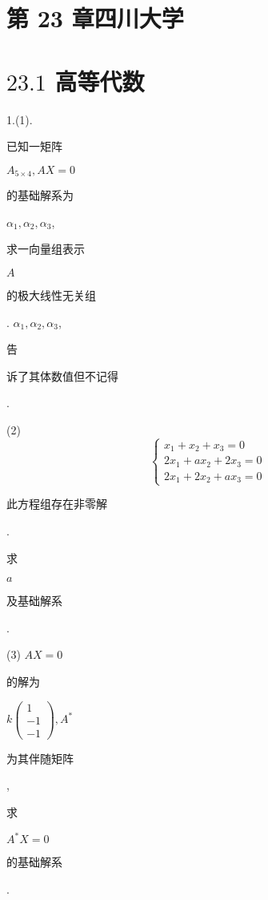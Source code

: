 \documentclass[10pt]{article}
\begin{document}
\section{第 23 章四川大学}
\section{$23.1$ 高等代数}
1.(1). \begin{CJK}{UTF8}{mj}已知一矩阵\end{CJK} $A_{5 \times 4}, A X=0$ \begin{CJK}{UTF8}{mj}的基础解系为\end{CJK} $\alpha_{1}, \alpha_{2}, \alpha_{3}$, \begin{CJK}{UTF8}{mj}求一向量组表示\end{CJK} $A$ \begin{CJK}{UTF8}{mj}的极大线性无关组\end{CJK}. $\alpha_{1}, \alpha_{2}, \alpha_{3}$, \begin{CJK}{UTF8}{mj}告\end{CJK} \begin{CJK}{UTF8}{mj}诉了其体数值但不记得\end{CJK}.

(2)
$$
\left\{\begin{array}{c}
x_{1}+x_{2}+x_{3}=0 \\
2 x_{1}+a x_{2}+2 x_{3}=0 \\
2 x_{1}+2 x_{2}+a x_{3}=0
\end{array}\right.
$$
\begin{CJK}{UTF8}{mj}此方程组存在非零解\end{CJK}. \begin{CJK}{UTF8}{mj}求\end{CJK} $a$ \begin{CJK}{UTF8}{mj}及基础解系\end{CJK}.

(3) $A X=0$ \begin{CJK}{UTF8}{mj}的解为\end{CJK} $k\left(\begin{array}{c}1 \\ -1 \\ -1\end{array}\right), A^{*}$ \begin{CJK}{UTF8}{mj}为其伴随矩阵\end{CJK}, \begin{CJK}{UTF8}{mj}求\end{CJK} $A^{*} X=0$ \begin{CJK}{UTF8}{mj}的基础解系\end{CJK}.
\end{document}
